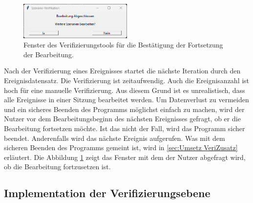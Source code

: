 \begin{figure}
    \begin{center}
        \vspace*{-9mm}
        \includegraphics[width=0.5\textwidth]{img/Verifikationstool/Verifikation Abfrage Bearbeitung fortsetzen.png}
        \vspace*{-10mm}
        \caption{Fenster des Verifizierungstools für die Bestätigung der Fortsetzung der Bearbeitung.}
        \label{fig:verif BearbFortsetz}
    \end{center}
\end{figure}
Nach der Verifizierung eines Ereignisses startet die nächste Iteration durch den Ereignisdatensatz. Die Verifizierung ist zeitaufwendig. Auch die Ereignisanzahl ist hoch für eine manuelle Verifizierung. Aus diesem Grund ist es unrealistisch, dass alle Ereignisse in einer Sitzung bearbeitet werden. Um Datenverlust zu vermeiden und ein sicheres Beenden des Programms möglichst einfach zu machen, wird der Nutzer vor dem Bearbeitungsbeginn des nächsten Ereignisses gefragt, ob er die Bearbeitung fortsetzen möchte. Ist das nicht der Fall, wird das Programm sicher beendet. Anderenfalls wird das nächste Ereignis aufgerufen. Was mit dem sicheren Beenden des Programms gemeint ist, wird in \autoref{sec:Umsetz VeriZusatz} erläutert. Die Abbildung \ref{fig:verif BearbFortsetz} zeigt das Fenster mit dem der Nutzer abgefragt wird, ob die Bearbeitung fortzusetzen ist.


\subsection{Implementation der Verifizierungsebene} \label{sec:Umsetz VeriEbene}

